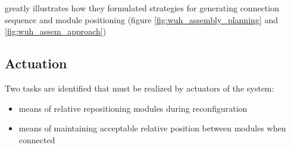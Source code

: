 \citet{o2014self} greatly illustrates how they formulated strategies for generating connection sequence and module positioning (figure \ref{fig:wuh_assembly_planning} and \ref{fig:wuh_assem_approach})
 \begin{figure}[h!]
	\centering
\end{figure}

\subsection{Actuation}
Two tasks are identified that must be realized by actuators of the system:
\begin{itemize}
	\item means of relative repositioning modules during reconfiguration
	\item means of maintaining acceptable relative position between modules when connected
\end{itemize}

